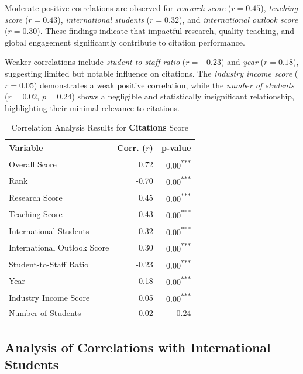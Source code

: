 \documentclass[sigconf]{acmart}
\begin{document}
Moderate positive correlations are observed for \textit{research score} ($r = 0.45$), \textit{teaching score} ($r = 0.43$), \textit{international students} ($r = 0.32$), and \textit{international outlook score} ($r = 0.30$). These findings indicate that impactful research, quality teaching, and global engagement significantly contribute to citation performance.

Weaker correlations include \textit{student-to-staff ratio} ($r = -0.23$) and \textit{year} ($r = 0.18$), suggesting limited but notable influence on citations. The \textit{industry income score} ($r = 0.05$) demonstrates a weak positive correlation, while the \textit{number of students} ($r = 0.02$, $p = 0.24$) shows a negligible and statistically insignificant relationship, highlighting their minimal relevance to citations.

\begin{table}[h!]
	\centering
	\caption{Correlation Analysis Results for \textbf{Citations} Score}
	\label{tab:correlation_citations}
	\begin{tabular}{|l|r|r|}
		\hline
		\textbf{Variable} & \textbf{Corr. ($r$)} & \textbf{p-value} \\
		\hline
		Overall Score & 0.72 & 0.00\textsuperscript{***} \\
		Rank & -0.70 & 0.00\textsuperscript{***} \\
		Research Score & 0.45 & 0.00\textsuperscript{***} \\
		Teaching Score & 0.43 & 0.00\textsuperscript{***} \\
		International Students & 0.32 & 0.00\textsuperscript{***} \\
		International Outlook Score & 0.30 & 0.00\textsuperscript{***} \\
		Student-to-Staff Ratio & -0.23 & 0.00\textsuperscript{***} \\
		Year & 0.18 & 0.00\textsuperscript{***} \\
		Industry Income Score & 0.05 & 0.00\textsuperscript{***} \\
		Number of Students & 0.02 & 0.24 \\
		\hline
	\end{tabular}
\end{table}


\subsection{Analysis of Correlations with International Students}
\end{document}
